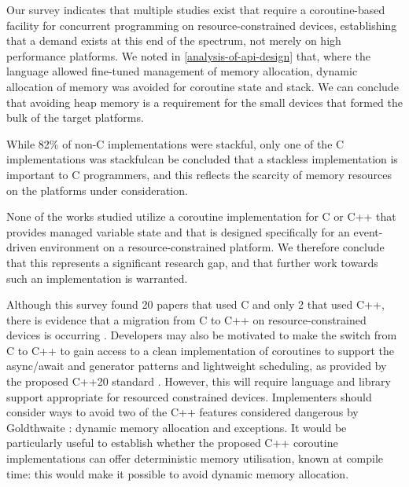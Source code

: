 Our survey indicates that multiple studies exist that require a coroutine-based facility for concurrent programming on resource-constrained devices, establishing that a demand exists at this end of the spectrum, not merely on high performance platforms. We noted in \DIFdelbegin {}\DIFdelend \DIFaddbegin {}\DIFaddend \ref{analysis-of-api-design} that, where the language allowed fine-tuned management of memory allocation, dynamic allocation of memory was avoided for coroutine state and stack. We can conclude that avoiding heap memory is a requirement for the small devices that formed the bulk of the target platforms.

While 82\% of non-C implementations were stackful, only one of the C implementations was stackful\DIFdelbegin {}\DIFdelend \DIFaddbegin {}\DIFaddend can be concluded that a stackless implementation is important to C programmers, and this reflects the scarcity of memory resources on the platforms under consideration.

None of the works studied utilize a coroutine implementation for C or C++ that provides managed variable state and that is designed specifically for an event-driven environment on a resource-constrained platform. We therefore conclude that this represents a significant research gap, and that further work towards such an implementation is warranted.

Although this survey found 20 papers that used C and only 2 that used C++, there is evidence that a migration from C to C++ on resource-constrained devices is occurring \cite{AspenCore2017}. Developers may also be motivated to make the switch from C to C++ to gain access to a clean implementation of coroutines to support the async/await and generator patterns and lightweight scheduling, as provided by the proposed C++20 standard \cite{ISO2017}. However, this will require language and library support appropriate for resourced constrained devices. Implementers should consider ways to avoid two of the C++ features considered dangerous by Goldthwaite \cite{Goldthwaite2006}: dynamic memory allocation and exceptions. It would be particularly useful to establish whether the proposed C++ coroutine implementations can offer deterministic memory utilisation, known at compile time: this would make it possible to avoid dynamic memory allocation.


